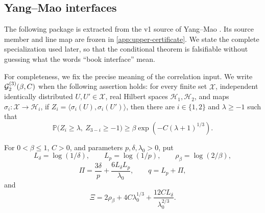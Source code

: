 \subsection{Yang--Mao interfaces}

The following package is extracted from the v1 source of
Yang--Mao \cite{YangMao2026}.  Its source member and line map are frozen in
\cref{app:upper-certificate}.  We state the complete specialization used
later, so that the conditional theorem is falsifiable without guessing what
the words ``book interface'' mean.

For completeness, we fix the precise meaning of the correlation input.  We
write \(\mathcal G_2^{(3)}(\beta,C)\) when the following assertion holds: for every
finite set \(\mathcal X\), independent identically distributed
\(U,U'\in\mathcal X\), real Hilbert spaces \(\mathcal H_1,\mathcal H_2\),
and maps \(\sigma_i:\mathcal X\to\mathcal H_i\), if
\(Z_i=\langle\sigma_i(U),\sigma_i(U')\rangle\), then there are
\(i\in\{1,2\}\) and \(\lambda\ge-1\) such that
\[
 \mathbb P\bigl(Z_i\ge\lambda,\ Z_{3-i}\ge-1\bigr)
 \ge \beta\exp\!\left(-C(\lambda+1)^{1/3}\right).
 \tag{2.2a}\label{eq:correlation-definition}
\]

For \(0<\beta\le1\), \(C>0\), and parameters
\(p,\delta,\lambda_0>0\), put
\[
 L_\delta=\log(1/\delta),\qquad L_p=\log(1/p),\qquad
 \rho_\beta=\log(2/\beta),
\]
\[
 \Pi=\frac{3\delta}{p}+\frac{6L_\delta L_p}{\lambda_0},\qquad
 q=L_p+\Pi,
 \tag{2.3}\label{eq:book-costs}
\]
and
\[
 \Xi=2\rho_\beta+4C\lambda_0^{1/3}
       +\frac{12CL_\delta}{\lambda_0^{2/3}}.
 \tag{2.4}\label{eq:reservoir-cost}
\]

